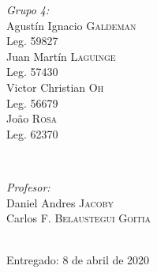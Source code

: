 \begin{titlepage}
    \begin{minipage}{0.4\textwidth}
    \begin{flushleft} \large
    \emph{Grupo 4:}\\		%
    [.3cm]
   Agust\'in Ignacio \textsc{Galdeman}\\
    Leg. 59827\\ 
    [.3cm]
    Juan Mart\'in \textsc{Laguinge}\\
    Leg. 57430\\ 
    [.3cm]
    Victor Christian \textsc{Oh}\\
    Leg. 56679\\ 
    [.3cm]
    Jo\~ao \textsc{Rosa}\\
    Leg. 62370 \\ 
    [.3cm]
    \end{flushleft}
    \end{minipage}
    ~
    \begin{minipage}{0.4\textwidth}
    \begin{flushright} \large
    \emph{Profesor:} \\
    [.3cm]
    Daniel Andres  \textsc{Jacoby}\\ %
    [.3cm]
    Carlos F. \textsc{Belaustegui Goitia}\\
    \end{flushright}
    \end{minipage}\\[2cm]
        
        
        
    \vfill
    {\large Entregado: 8 de abril de 2020}\\[2cm] %
        
        
         
        
        
    \end{titlepage}